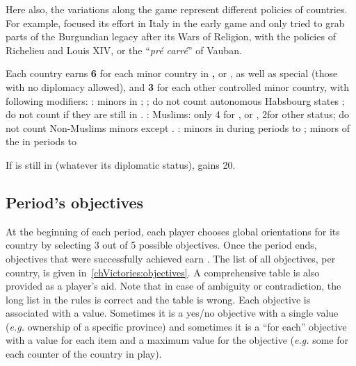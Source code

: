 \begin{designnote}
  Here also, the variations along the game represent different policies of
  countries. For example, \FRA focused its effort in Italy in the early game
  and only tried to grab parts of the Burgundian legacy after its Wars of
  Religion, with the policies of Richelieu and Louis XIV, or the ``\emph{pré
    carré}'' of Vauban.
\end{designnote}

\bparag Each country earns {\bf 6 \VPs} for each minor country in {\bf
  \VASSAL, \ANNEXION} or {\bf \dipAT}, as well as special \EW (those
with no diplomacy allowed), and {\bf 3 \VPs} for each other controlled
minor country, with following modifiers:
\bparag \HIS: minors in \regionItalie {}; \paysChevaliers
{} ; do not count autonomous Habsbourg states ; do not count
\paysChevaliers if they are still in \provinceRhodos.
\bparag \TUR: Muslims: only 4 \VPs for \VASSAL, \ANNEXION or \dipAT, 2\VPs for
other status; do not count Non-Muslims minors except \paysTransylvanie.
\bparag \FRA: minors in \regionItalie {} during periods
 to  ; minors of the \HRE {} in periods
 to 

\aparag[Special]
\bparag If \paysChevaliers is still in \provinceRhodos (whatever its
diplomatic status), \HIS gains 20\VPs.

\subsection{Period's objectives}
\aparag[Overview]
\bparag At the beginning of each period, each player chooses global
orientations for its country by selecting 3 out of 5 possible objectives.
\bparag Once the period ends, objectives that were successfully achieved earn
\VPs.
\bparag The list of all objectives, per country, is given
in~\ref{chVictories:objectives}. A comprehensive table is also provided as a
player's aid. Note that in case of ambiguity or contradiction, the long list
in the rules is correct and the table is wrong.
\bparag Each objective is associated with a \VPs value. Sometimes it is a
yes/no objective with a single value (\emph{e.g.} ownership of a specific
province) and sometimes it is a ``for each'' objective with a value for each
item and a maximum value for the objective (\emph{e.g.} some \VPs for each
\TradeFLEET counter of the country in play).

